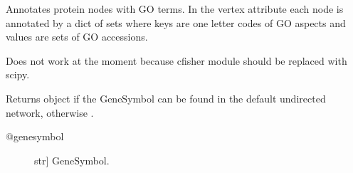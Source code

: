 \documentclass[letterpaper,10pt,english]{sphinxmanual}
\begin{document}
\begin{fulllineitems}
\begin{fulllineitems}
\begin{quote}
\begin{description}
\end{description}\end{quote}

\end{fulllineitems}


\begin{fulllineitems}
\label{\detokenize{reference:pypath.main.PyPath.get_taxon}}
\end{fulllineitems}


\begin{fulllineitems}
\label{\detokenize{reference:pypath.main.PyPath.go_annotate_graph}}
Annotates protein nodes with GO terms. In the  vertex
attribute each node is annotated by a dict of sets where keys are
one letter codes of GO aspects and values are sets of GO accessions.

\end{fulllineitems}


\begin{fulllineitems}
\label{\detokenize{reference:pypath.main.PyPath.go_enrichment}}
Does not work at the moment because cfisher module should be
replaced with scipy.

\end{fulllineitems}


\begin{fulllineitems}
\label{\detokenize{reference:pypath.main.PyPath.gs}}
Returns  object if the GeneSymbol
can be found in the default undirected network,
otherwise .
\begin{description}
\item[{@genesymbol}] \leavevmode{[}str{]}
GeneSymbol.


\end{description}
\end{fulllineitems}
\end{fulllineitems}
\end{document}
